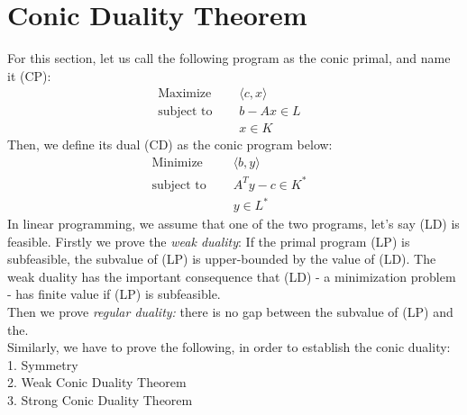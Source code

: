 \documentclass[12pt]{article}
\begin{document}
   \section{Conic Duality Theorem}
    For this section, let us call the following program as the conic primal, and name it (CP):
    \begin{align*}
 \text{Maximize } \quad  &\langle c,x \rangle \\
\text{subject to } \quad  &b - Ax \in L &
\tag{P}\\
 &x \in K   			
   	\end{align*}
   	Then, we define its dual (CD) as the conic program below:
   	 \begin{align*}
\text{Minimize } \quad  &\langle b,y \rangle \\
\text{subject to } \quad  &A^Ty - c \in K^* &
\tag{D}\\
  &y \in L^*   			
   	\end{align*}
   	In linear programming, we assume that one of the two programs, let's say (LD) is feasible. Firstly we prove the \textit{weak duality}: If the primal program (LP) is subfeasible, the subvalue of (LP) is upper-bounded by the value of (LD). The weak duality has the important consequence that (LD) - a minimization problem - has finite value if (LP) is subfeasible. \\
   	Then we prove \textit{regular duality:} there is no gap between the subvalue of (LP) and the. \\
   	Similarly, we have to prove the following, in order to establish the conic duality: \\
   	1. Symmetry \\ 
	2. Weak Conic Duality Theorem \\
	3. Strong Conic Duality Theorem \\
\end{document}
